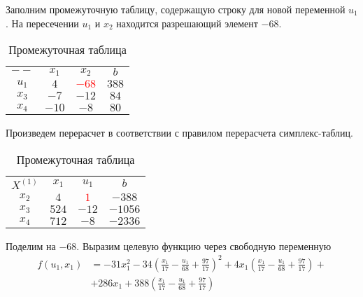 Заполним промежуточную таблицу, содержащую строку для новой переменной $u_1$. На пересечении $u_1$ и $x_2$ находится разрешающий элемент $-68$. 
\begin{table}[H]
\begin{center}
	\def\tabcolsep{15pt}
	\def\arraystretch{1.3}
	\caption{Промежуточная таблица}
	\label{tab:simplex_1}
	\begin{tabular}{|c||c|c||c|}
		\hline
		$--$ & $x_1$ & $x_2$ & $b$ \\ 
		\hhline{|=#==#=|}
		$u_1$ & $4$ & \textcolor{red}{\boldmath$-68$} & $388$ \\ 
		\hline
		$x_3$ & $-7$ & $-12$ & $84$ \\ 
		\hline
		$x_4$ & $-10$ & $-8$ & $80$ \\ 
		\hline
	\end{tabular}
\end{center}
\end{table}

Произведем перерасчет в соответствии с правилом перерасчета симплекс-таблиц.

\begin{table}[H]
\begin{center}
	\def\tabcolsep{15pt}
	\def\arraystretch{1.3}
	\caption{Промежуточная таблица}
	\label{tab:simplex_1}
	\begin{tabular}{|c||c|c||c|}
		\hline
		$X^{(1)}$ & $x_1$ & $u_1$ & $b$ \\ 
		\hhline{|=#==#=|}
		$x_2$ & $4$ & \textcolor{red}{\boldmath$1$} & $-388$ \\ 
		\hline
		$x_3$ & $524$ & $-12$ & $-1056$ \\ 
		\hline
		$x_4$ & $712$ & $-8$ & $-2336$ \\ 
		\hline
	\end{tabular}
\end{center}
\end{table}

Поделим на $-68$. Выразим целевую функцию через свободную переменную 
\begin{align*}
f(u_1, x_1) &= -31 x_1^2 - 34 \left(\frac{x_1}{17} - \frac{u_1}{68} + \frac{97}{17}\right)^2 + 4 x_1 \left(\frac{x_1}{17} - \frac{u_1}{68} + \frac{97}{17}\right) + \\ &+ 286 x_1 + 388 \left(\frac{x_1}{17} - \frac{u_1}{68} + \frac{97}{17}\right)
\end{align*}

